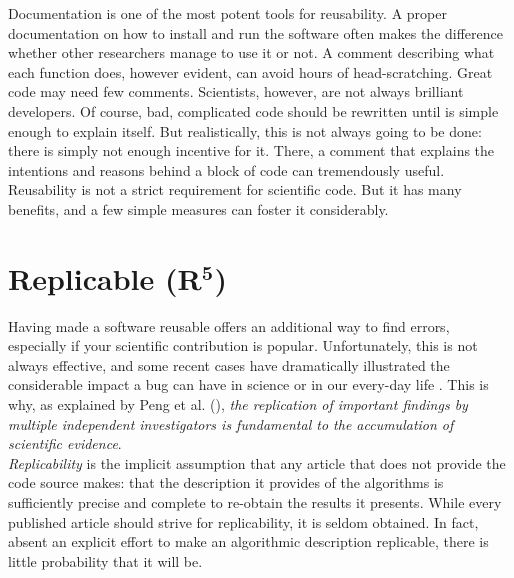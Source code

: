 \documentclass[a4paper,11pt]{article}
\begin{document}
Documentation is one of the most potent tools for reusability. A proper documentation on how to install and run the software often makes the difference whether other researchers manage to use it or not. A comment describing what each function does, however evident, can avoid hours of head-scratching. Great code may need few comments. Scientists, however, are not always brilliant developers. Of course, bad, complicated code should be rewritten until is simple enough to explain itself. But realistically, this is not always going to be done: there is simply not enough incentive for it. There, a comment that explains the intentions and reasons behind a block of code can tremendously useful.\\

Reusability is not a strict requirement for scientific code. But it has many benefits, and a few simple measures can foster it considerably.


\section*{Replicable (R$^{\mathbf 5}$)}

Having made a software reusable offers an additional way to find errors, especially if your scientific contribution is popular. Unfortunately, this is not always effective, and some recent cases have dramatically illustrated the considerable impact a bug can have in science
\citep{Eklund:2016} or in our every-day life \citep{Durumeric:2014}. This is
why, as explained by Peng et al. (\cite{Peng:2006}), {\em the replication of
  important findings by multiple independent investigators is fundamental to
  the accumulation of scientific evidence}.\\

\emph{Replicability} is the implicit
assumption that any article that does not provide the code source makes: that
the description it provides of the algorithms is sufficiently precise and
complete to re-obtain the results it presents. While every published article
should strive for replicability, it is seldom obtained. In fact, absent an explicit effort to make an algorithmic description replicable, there is little probability that it will be.\\
\end{document}
